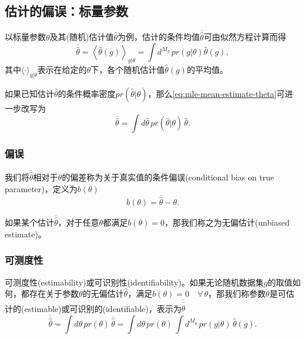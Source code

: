 \subsection{估计的偏误：标量参数}
\label{sec:mle-bias-scalar}

以标量参数$\theta$及其(随机)估计值$\hat{\theta}$为例，估计的条件均值$\overline{\hat{\theta}}$可由似然方程计算而得
\begin{equation}
  \label{eq:mle-mean-estimate-theta}
  \overline{\hat{\theta}} =
  \left\langle
  \hat{\theta}(g)
  \right\rangle_{g|\theta}
  = \int d^{M_g} \, pr(g | \theta) \hat{\theta}(g),
\end{equation}
其中$\langle \cdot \rangle_{g|\theta}$表示在给定的$\theta$下，各个随机估计值$\hat{\theta}(g)$的平均值。

如果已知估计$\hat{\theta}$的条件概率密度$pr \left(\hat{\theta} | \theta \right)$，那么\eqref{eq:mle-mean-estimate-theta}可进一步改写为
\begin{equation}
  \label{eq:mle-hat-theta-random}
  \overline{\hat{\theta}} = \int d \hat{\theta} \, pr \left( \hat{\theta} | \theta \right) \, \hat{\theta}.
\end{equation}



\subsubsection{偏误}
\label{sec:mle-bias-def}
我们将$\overline{\hat{\theta}}$相对于$\theta$的偏差称为关于真实值的条件偏误(conditional bias on true parameter)，定义为$b(\theta)$
\begin{equation}
  \label{eq:mle-conditional-bias}
  b(\theta) = \overline{\hat{\theta}} - \theta.
\end{equation}

如果某个估计$\overline{\hat{\theta}}$，对于任意$\theta$都满足$b(\theta) = 0$，那我们称之为无偏估计(unbiased estimate)。

\subsubsection{可测度性}
\label{sec:mle-estimability}
可测度性(estimability)或可识别性(identifiability)。如果无论随机数据集$g$的取值如何，都存在关于参数$\theta$的无偏估计$\hat{\theta}$，满足$b(\theta) = 0 \quad \forall \, \theta$，那我们称参数$\theta$是可估计的(estimable)或可识别的(identifiable)，表示为$\overline{\overline{\hat{\theta}}}$
\begin{equation}
  \label{eq:mle-estimablility}
  \overline{\overline{\hat{\theta}}}
  = \int d \theta \, pr(\theta) \, \overline{\hat{\theta}}
  = \int d \theta \, pr(\theta) \, \int d^{M_g} \, pr(g | \theta) \, \hat{\theta}(g).
\end{equation}

